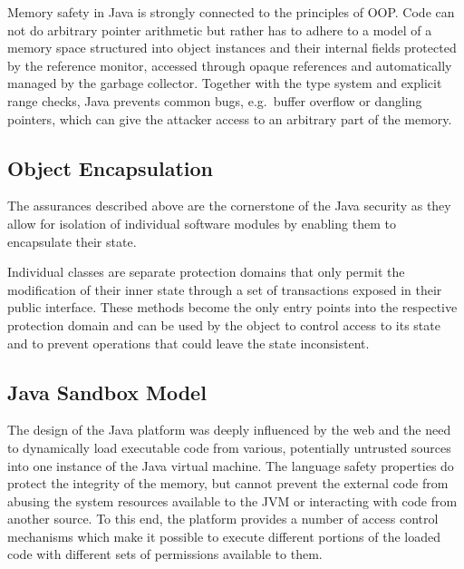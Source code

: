 \documentclass[a4paper,12pt,twoside,openright]{report}
\begin{document}
Memory safety in Java is strongly connected to the principles of OOP. Code can not do arbitrary pointer arithmetic but rather has to adhere to a model of a memory space structured into object instances and their internal fields protected by the reference monitor, accessed through opaque references and automatically managed by the garbage collector. Together with the type system and explicit range checks, Java prevents common bugs, e.g.\ buffer overflow or dangling pointers, which can give the attacker access to an arbitrary part of the memory.

\subsection{Object Encapsulation}

The assurances described above are the cornerstone of the Java security as they allow for isolation of individual software modules by enabling them to encapsulate their state. 

Individual classes are separate protection domains that only permit the modification of their inner state through a set of transactions exposed in their public interface. These methods become the only entry points into the respective protection domain and can be used by the object to control access to its state and to prevent operations that could leave the state inconsistent.


\subsection{Java Sandbox Model}

The design of the Java platform was deeply influenced by the web and the need to dynamically load executable code from various, potentially untrusted sources into one instance of the Java virtual machine. The language safety properties do protect the integrity of the memory, but cannot prevent the external code from abusing the system resources available to the JVM or interacting with code from another source. To this end, the platform provides a number of access control mechanisms which make it possible to execute different portions of the loaded code with different sets of permissions available to them. 
\end{document}
